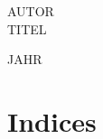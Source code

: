 \documentclass[a4paper,11pt]{memoir}
\begin{document}
\begin{titlingpage}
\thispagestyle{empty}
\begin{center}
\Large{AUTOR\\TITEL}\\
\end{center}
\vspace*{\fill}
\begin{center}
\large{JAHR}\par
\end{center}
\end{titlingpage}
\frontmatter

\cleardoublepage
\renewcommand{\contentsname}{Inhalt}
\tableofcontents*
\mainmatter
\backmatter
\nocite{*} %
\printbibliography %
\chapter{Indices}
\printindex[bibel]
\printindex[antik]
\printindex[autoren]
\end{document}
